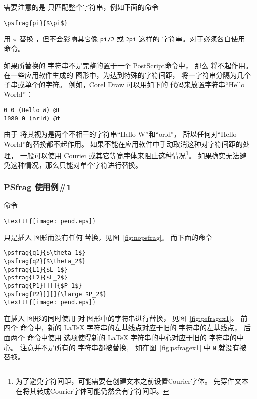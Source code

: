 需要注意的是  只匹配整个字符串，例如下面的命令
\begin{lstlisting}
\psfrag{pi}{$\pi$}
\end{lstlisting}
用 $\pi$ 替换 ，但不会影响其它像 \texttt{pi/2} 或 \texttt{2pi} 这样的  字符串。对于必须各自使用  命令。

如果所替换的  字符串不是完整的置于一个 PostScript命令中，
那么  将不起作用。
在一些应用软件生成的  图形中，为达到特殊的字符间距，
将一字符串分隔为几个子串或单个的字符。
例如，Corel Draw 可以用如下的  代码来放置字符串“Hello World”：
\begin{Verbatim}[xleftmargin=1cm]
0 0 (Hello W) @t
1080 0 (orld) @t
\end{Verbatim}
由于  将其视为是两个不相干的字符串“Hello W”和“orld”，
所以任何对“Hello World”的替换都不起作用。
如果不能在应用软件中手动取消这种对字符间距的处理，
一般可以使用 Courier 或其它等宽字体来阻止这种情况\footnote{
	为了避免字符间距，可能需要在创建文本之前设置Courier字体。
	先穿件文本在将其转成Courier字体可能仍然会有字符间距。}。
如果确实无法避免这种情况，那么只能对单个字符进行替换。

\subsubsection{PSfrag 使用例\#1}\label{sssec:psfragex1}

命令
\begin{lstlisting}
\texttt{[image: pend.eps]}
\end{lstlisting}
只是插入  图形而没有任何  替换，见图~\ref{fig:nopsfrag}。
而下面的命令
\begin{lstlisting}
\psfrag{q1}{$\theta_1$}
\psfrag{q2}{$\theta_2$}
\psfrag{L1}{$L_1$}
\psfrag{L2}{$L_2$}
\psfrag{P1}[][]{$P_1$}
\psfrag{P2}[][]{\large $P_2$}
\texttt{[image: pend.eps]}
\end{lstlisting}
在插入  图形的同时使用  对  图形中的字符串进行替换，
见图~\ref{fig:psfragex1}。
前四个  命令中，新的 \LaTeX{} 字符串的左基线点对应于旧的  字符串的左基线点，
后面两个  命令中使用 \opt{[][]} 选项使得新的 \LaTeX{} 字符串的中心对应于旧的  字符串的中心。
注意并不是所有的  字符串都被替换，
如在图~\ref{fig:psfragex1} 中 \texttt{N} 就没有被替换。

